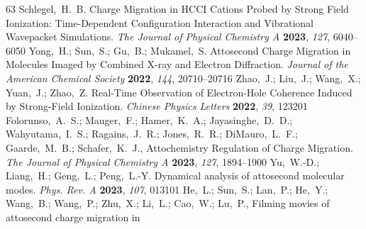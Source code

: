 \documentclass[journal=jacsat,manuscript=article]{achemso}
\begin{document}
\begin{mcitethebibliography}{63}
{\mcitedefaultendpunct}{\mcitedefaultseppunct}\relax
\EndOfBibitem
{}
Schlegel,~H.~B. Charge Migration in HCCI Cations Probed by Strong Field
  Ionization: Time-Dependent Configuration Interaction and Vibrational
  Wavepacket Simulations. \emph{The Journal of Physical Chemistry A}
  \textbf{2023}, \emph{127}, 6040--6050\relax
\mciteBstWouldAddEndPuncttrue
\mciteSetBstMidEndSepPunct{\mcitedefaultmidpunct}
{\mcitedefaultendpunct}{\mcitedefaultseppunct}\relax
\EndOfBibitem
{}
Yong,~H.; Sun,~S.; Gu,~B.; Mukamel,~S. Attosecond Charge Migration in Molecules
  Imaged by Combined X-ray and Electron Diffraction. \emph{Journal of the
  American Chemical Society} \textbf{2022}, \emph{144}, 20710--20716\relax
\mciteBstWouldAddEndPuncttrue
\mciteSetBstMidEndSepPunct{\mcitedefaultmidpunct}
{\mcitedefaultendpunct}{\mcitedefaultseppunct}\relax
\EndOfBibitem
{}
Zhao,~J.; Liu,~J.; Wang,~X.; Yuan,~J.; Zhao,~Z. Real-Time Observation of
  Electron-Hole Coherence Induced by Strong-Field Ionization. \emph{Chinese
  Physics Letters} \textbf{2022}, \emph{39}, 123201\relax
\mciteBstWouldAddEndPuncttrue
\mciteSetBstMidEndSepPunct{\mcitedefaultmidpunct}
{\mcitedefaultendpunct}{\mcitedefaultseppunct}\relax
\EndOfBibitem
{}
Folorunso,~A.~S.; Mauger,~F.; Hamer,~K.~A.; Jayasinghe,~D.~D.;
  Wahyutama,~I.~S.; Ragains,~J.~R.; Jones,~R.~R.; DiMauro,~L.~F.;
  Gaarde,~M.~B.; Schafer,~K.~J.,   Attochemistry Regulation of
  Charge Migration. \emph{The Journal of Physical Chemistry A} \textbf{2023},
  \emph{127}, 1894--1900\relax
\mciteBstWouldAddEndPuncttrue
\mciteSetBstMidEndSepPunct{\mcitedefaultmidpunct}
{\mcitedefaultendpunct}{\mcitedefaultseppunct}\relax
\EndOfBibitem
{}
Yu,~W.-D.; Liang,~H.; Geng,~L.; Peng,~L.-Y. Dynamical analysis of attosecond
  molecular modes. \emph{Phys. Rev. A} \textbf{2023}, \emph{107}, 013101\relax
\mciteBstWouldAddEndPuncttrue
\mciteSetBstMidEndSepPunct{\mcitedefaultmidpunct}
{\mcitedefaultendpunct}{\mcitedefaultseppunct}\relax
\EndOfBibitem
{}
He,~L.; Sun,~S.; Lan,~P.; He,~Y.; Wang,~B.; Wang,~P.; Zhu,~X.; Li,~L.; Cao,~W.;
  Lu,~P.,   Filming movies of attosecond charge migration in

\end{mcitethebibliography}
\end{document}

